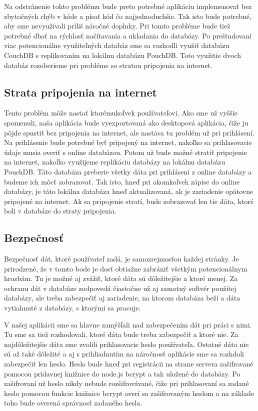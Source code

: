 \indent Na odstránenie tohto problému bude preto potrebné aplikáciu implemenovať bez zbytočných chýb v kóde a písať kód čo najjednoduchšie. Tak isto bude potrebné, aby sme nevyužívali príliš náročné doplnky. Pri tomto probléme bude tiež potrebné dbať na rýchlosť načítavania a ukladania do databázy. Po preštudovaní viac potencionálne využiteľných databáz sme sa rozhodli využiť databázu CouchDB s replikovaním na lokálnu databázu PouchDB. Toto využitie dvoch databáz rozoberieme pri probléme so stratou pripojenia na internet.

\subsection{Strata pripojenia na internet}
\indent Tento problém môže nastať ktorémukoľvek používateľovi. Ako sme už vyššie spomenuli, naša aplikácia bude vyexportovaná ako desktopová aplikácia, čiže ju pôjde spustiť bez pripojenia na internet, ale nastáva tu problém už pri prihlásení. Na prihlásenie bude potrebné byť pripojený na internet, nakoľko sa prihlasovacie údaje musia overiť s online databázou. Potom už bude možné stratiť pripojenie na internet, nakoľko využijeme replikáciu databázy na lokálnu databázu PouchDB. Táto databáza preberie všetky dáta pri prihláseni z online databázy a budeme ich môcť zobrazovať. Tak isto, hneď pri akomkoľvek zápise do online databázy, je táto lokálna databáza hneď aktualizovaná, ak je zariadenie opätovne pripojené na internet. Ak sa pripojenie stratí, bude zobrazovať len tie dáta, ktoré boli v databáze do straty pripojenia. 

\subsection{Bezpečnosť}
\indent Bezpečnosť dát, ktoré používateľ zadá, je samozrejmosťou každej stránky. Je prirodzené, že v tomto bode je dosť obtiažne zabrániť všetkým potencionálnym hrozbám. Tu je možné aj zvážiť, ktoré dáta sú dôležitejšie a ktoré menej. Za ochranu dát v databáze zodpovedá čiastočne už aj samotný softvér použitej databázy, ale treba zabezpečiť aj zariadenie, na ktorom databáza beží a dáta vytiahnuté z databázy, s ktorými sa pracuje.

\indent V našej aplikácii sme sa hlavne zamýšľali nad zabezpečením dát pri práci s nimi. Tu sme sa tiež rozhodovali, ktoré dáta bude treba zabezpečiť a ktoré nie. Za najdôležitejšie dáta sme zvolili prihlasovacie heslo používateľa. Ostatné dáta nie sú až také dôležité a aj s prihliadnutím na náročnosť aplikácie sme sa rozhdoli zabezpečiť len heslo. Heslo bude hneď pri registrácii na strane servera zašifrované pomocou prídavnej knižnice do node.js bcrypt a tak uložené do databázy. Po zašifrovaní už heslo nikdy nebude rozšifrovávané, čiže pri prihlasovaní sa zadané heslo pomocou funkcie knižnice bcrypt overí so zašifrovaným heslom a na základe toho bude overená správnosť zadaného hesla. 

